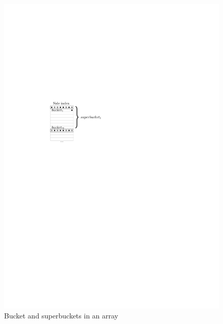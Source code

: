 \begin{figure}[h!]
	\centering
	\label{figure-bucketshop}
	\includegraphics{img/bucketshop.pdf}
	\caption{Bucket and superbuckets in an array}
\end{figure}
